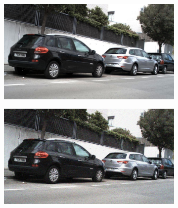 \documentclass[a4paper]{ctexart}
\begin{document}
\begin{figure}[htbp]
\begin{subfigure}{0.08\textwidth}
				\label{fig：Gamma=0.5, Gauss Noise = 1.0}
			\end{subfigure} \\
			
			\vspace{-15pt}
			
			\begin{subfigure}{0.02\textwidth}
				\captionsetup{font=scriptsize}
				\caption*{}
				\vspace{-2pt}
			\end{subfigure}
			\begin{subfigure}{0.08\textwidth}
				\captionsetup{font=scriptsize}
				\includegraphics[width=\linewidth]{picture/Edge Detection/degrade/RGB_001 Gamma=0.6, Gauss Noise=0.0}
				\label{fig: Gamma=0.6, Gauss Noise = 0.0}
			\end{subfigure}
			\begin{subfigure}{0.08\textwidth}
				\captionsetup{font=scriptsize}
				\includegraphics[width=\linewidth]{picture/Edge Detection/degrade/RGB_001 Gamma=0.6, Gauss Noise=0.1}

\end{subfigure}
\end{figure}
\end{document}
